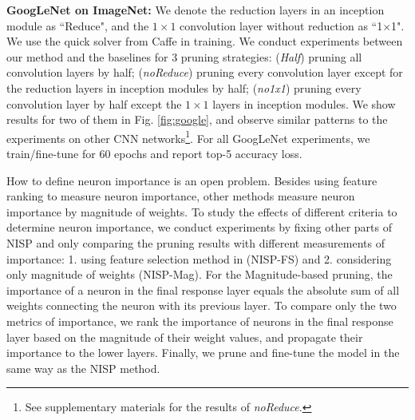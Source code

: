 \documentclass[10pt,twocolumn,letterpaper]{article}
\begin{document}
\textbf{GoogLeNet on ImageNet:}
We denote the reduction layers in an inception module as ``Reduce", and the $1 \times 1$ convolution layer without reduction as ``1$\times$1".
We use the quick solver from Caffe in training. 
We conduct experiments between our method and the baselines for 3 pruning strategies: (\textsl{Half}) pruning all convolution layers by half; (\textsl{noReduce}) pruning every convolution layer except for the reduction layers in inception modules by half; (\textsl{no1x1}) pruning every convolution layer  by half except the $1 \times 1$ layers in inception modules. We show results for two of them in Fig. \ref{fig:google}, and observe similar patterns to the experiments on other CNN networks\footnote{See supplementary materials for the results of \textsl{noReduce}.}. For all GoogLeNet experiments, we train/fine-tune for 60 epochs and report top-5 accuracy loss.

How to define neuron importance is an open problem. Besides using feature ranking to measure neuron importance, other methods \cite{pruneweigth,thinet,DeepCompress} measure neuron importance by magnitude of weights. To study the effects of different criteria to determine neuron importance, we conduct experiments by fixing other parts of NISP and only comparing the pruning results with different measurements of importance: 1. using feature selection method in \cite{Roffo_2015_ICCV} (NISP-FS) and 2. considering only magnitude of weights (NISP-Mag).
For the Magnitude-based pruning, the importance of a neuron in the final response layer equals the absolute sum of all weights connecting the neuron with its previous layer. To compare only the two metrics of importance, we rank the importance of neurons in the final response layer based on the magnitude of their weight values, and propagate their importance to the lower layers. Finally, we prune and fine-tune the model in the same way as the NISP method. 
\end{document}
